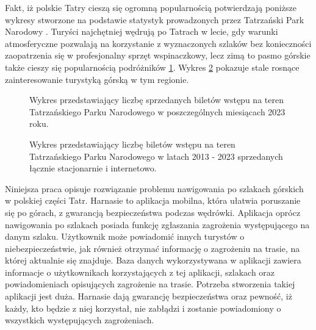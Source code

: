 Fakt, iż polskie Tatry cieszą się ogromną popularnością potwierdzają poniższe wykresy stworzone na podstawie statystyk prowadzonych przez Tatrzański Park Narodowy \cite{tpnstat}. Turyści najchętniej wędrują po Tatrach w lecie, gdy warunki atmosferyczne pozwalają na korzystanie z wyznaczonych szlaków bez konieczności zaopatrzenia się w profesjonalny sprzęt wspinaczkowy, lecz zimą to pasmo górskie także cieszy się popularnością podróżników \ref{sprzedaz2023}. Wykres \ref{sprzedaz} pokazuje stale rosnące zainteresowanie turystyką górską w tym regionie. 

\begin{figure}[H]
    \centering
    \caption{Wykres przedstawiający liczbę sprzedanych biletów wstępu na teren Tatrzańskiego Parku Narodowego w poszczególnych miesiącach 2023 roku.
}
    \label{sprzedaz2023}
\end{figure}

\begin{figure}[H]
    \centering
    \caption{Wykres przedstawiający liczbę biletów wstępu na teren Tatrzańskiego Parku Narodowego w latach 2013 - 2023 sprzedanych łącznie stacjonarnie i internetowo.}
    \label{sprzedaz}
\end{figure}
 
Niniejsza praca opisuje rozwiązanie problemu nawigowania po szlakach górskich w polskiej części Tatr. Harnasie to aplikacja mobilna, która ułatwia poruszanie się po górach, z gwarancją bezpieczeństwa podczas wędrówki. Aplikacja oprócz nawigowania po szlakach posiada funkcję zgłaszania zagrożenia występującego na danym szlaku. Użytkownik może powiadomić innych turystów o niebezpieczeństwie, jak również otrzymać informację o zagrożeniu na trasie, na której aktualnie się znajduje. Baza danych wykorzystywana w aplikacji zawiera informacje o użytkownikach korzystających z tej aplikacji, szlakach oraz powiadomieniach opisujących zagrożenie na trasie. Potrzeba stworzenia takiej aplikacji jest duża. Harnasie dają gwarancję bezpieczeństwa oraz pewność, iż każdy, kto będzie z niej korzystał, nie zabłądzi i zostanie powiadomiony o wszystkich występujących zagrożeniach.

